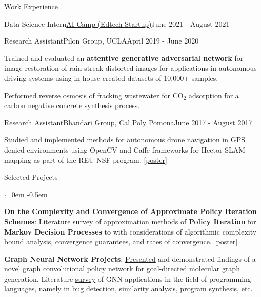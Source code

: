 \documentclass{resume}
\begin{document}
\begin{rSection}{Work Experience}
\begin{rSubsection}{Data Science Intern}{\href{https://www.ai-camp.org/}{AI Camp (Edtech Startup)}}{June 2021 - August 2021}
    \end{rSubsection}
    \begin{rSubsection}{Research Assistant}{Pilon Group, UCLA}{April 2019 - June 2020}
        \item Trained and evaluated an \textbf{attentive generative adversarial network} for image restoration of rain streak distorted
        images for applications in autonomous driving systems using in house created datasets of 10,000+ samples.
        \item Performed reverse osmosis of fracking wastewater for $\text{CO}_2$ adsorption for a carbon negative concrete synthesis process.
    \end{rSubsection}
    \begin{rSubsection}{Research Assistant}{\small Bhandari Group, Cal Poly Pomona}{June 2017 - August 2017}
        \item Studied and implemented methods for autonomous drone navigation in GPS denied environments using OpenCV and Caffe frameworks for Hector SLAM mapping as part of the REU NSF program.
        \href{https://docs.google.com/presentation/d/1fp-MPZUgKS_PhMD90d4aL0Rh0-YfghnEYHb3sHKmnGE/edit?usp=sharing}{[poster]}
    \end{rSubsection}
\end{rSection}

\begin{rSection}{Selected Projects}
    \vspace{0.5em}
    \begin{list}{$\cdot$}{\leftmargin=0em}
      \itemsep -0.5em \vspace{-0.5em}
        \item {\bf On the Complexity and Convergence of Approximate Policy Iteration Schemes}:
        Literature \href{https://github.com/joostinyi/ECE239AS/blob/master/RL_S20.pdf}{survey} of approximation methods of \textbf{Policy Iteration}
        for \textbf{Markov Decision Processes} to with considerations of algorithmic complexity bound analysis, convergence guarantees, and rates of convergence. 
        \href{https://github.com/joostinyi/ECE239AS/blob/master/Approximate-Policy-Iteration-Poster.pdf}{[poster]}
        \item {\bf Graph Neural Network Projects}:
        \href{https://github.com/yichousun/Winter2021_CS249_GNN/tree/main/Paper_Presentation/Graph_Synthesis/GCPN}{Presented} and demonstrated findings of a novel graph convolutional policy network for goal-directed molecular graph generation.
        Literature \href{https://github.com/Sripathm2/GNNSurvey}{survey} of GNN applications in the field of programming languages, namely in bug detection, similarity analysis, program synthesis, etc.
    \end{list}
    \end{rSection}
\end{document}
